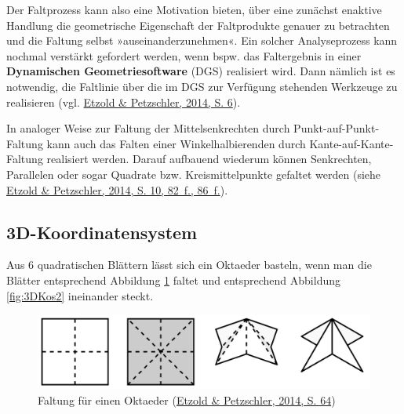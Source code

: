 \documentclass[
]{scrbook}
\theoremstyle{definition}
\theoremstyle{definition}
\theoremstyle{definition}
\theoremstyle{definition}
\theoremstyle{remark}
\begin{document}
Der Faltprozess kann also eine Motivation bieten, über eine zunächst enaktive Handlung die geometrische Eigenschaft der Faltprodukte genauer zu betrachten und die Faltung selbst »auseinanderzunehmen«. Ein solcher Analyseprozess kann nochmal verstärkt gefordert werden, wenn bspw. das Faltergebnis in einer \textbf{Dynamischen Geometriesoftware} (DGS) realisiert wird. Dann nämlich ist es notwendig, die Faltlinie über die im DGS zur Verfügung stehenden Werkzeuge zu realisieren (vgl. \protect\hyperlink{ref-Etzold2014a}{Etzold \& Petzschler, 2014, S. 6}).

In analoger Weise zur Faltung der Mittelsenkrechten durch Punkt-auf-Punkt-Faltung kann auch das Falten einer Winkelhalbierenden durch Kante-auf-Kante-Faltung realisiert werden. Darauf aufbauend wiederum können Senkrechten, Parallelen oder sogar Quadrate bzw. Kreismittelpunkte gefaltet werden (siehe \protect\hyperlink{ref-Etzold2014a}{Etzold \& Petzschler, 2014, S. 10, 82~f., 86~f.}).

\hypertarget{d-koordinatensystem}{%
\subsection{3D-Koordinatensystem}\label{d-koordinatensystem}}

Aus 6 quadratischen Blättern lässt sich ein Oktaeder basteln, wenn man die Blätter entsprechend Abbildung \ref{fig:3DKos1} faltet und entsprechend Abbildung \ref{fig:3DKos2} ineinander steckt.



\begin{figure}

{\centering \includegraphics[width=0.75\linewidth]{pictures/12-3DKos1} 

}

\caption{Faltung für einen Oktaeder (\protect\hyperlink{ref-Etzold2014a}{Etzold \& Petzschler, 2014, S. 64})}\label{fig:3DKos1}
\end{figure}
\end{document}
